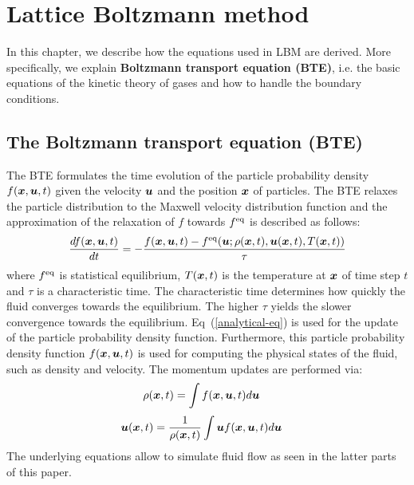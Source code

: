 \chapter{Lattice Boltzmann method}
\vspace{-8mm}
In this chapter, we describe how the equations used in LBM
are derived.
More specifically, we explain
{\bf Boltzmann transport equation (BTE)}\cite{mcnamara1988use}, i.e.
the basic equations of the kinetic theory of gases and
how to handle the boundary conditions.

\section{The Boltzmann transport equation (BTE)}
The BTE formulates the time evolution of the 
particle probability density $f(\boldsymbol{x}, \boldsymbol{u}, t)$ given
the velocity $\boldsymbol{u}$ and the position $\boldsymbol{x}$ of particles.
The BTE relaxes the particle distribution to
the Maxwell velocity distribution
function\cite{huang1963statistical} and the approximation of the relaxation of
$f$ towards $f^{\rm eq}$ is described as follows\cite{bhatnagar1954model}:
\begin{equation}
  \begin{aligned}
    \frac{d f(\boldsymbol{x}, \boldsymbol{u}, t)}{d t} &= 
    - \frac{
      f(\boldsymbol{x}, \boldsymbol{u}, t) - f^{\rm eq}(\boldsymbol{u}; \rho(\boldsymbol{x}, t), \boldsymbol{u}(\boldsymbol{x}, t), T(\boldsymbol{x}, t))
      }{\tau} \\
    \end{aligned}
    \label{analytical-eq}
  \end{equation}
where $f^{\rm eq}$ is statistical equilibrium,
$T(\boldsymbol{x}, t)$ is the temperature at $\boldsymbol{x}$
of time step $t$ and
$\tau$ is a characteristic time.
The characteristic time determines how quickly
the fluid converges towards the equilibrium.
The higher $\tau$ yields the slower 
convergence towards the equilibrium.
Eq~(\ref{analytical-eq}) is used for the update 
of the particle probability density function.
Furthermore, this particle probability density function
$f(\boldsymbol{x}, \boldsymbol{u}, t)$ is used for computing
the physical states of the fluid,
such as density and velocity.
The momentum updates are performed via\cite{caroli1984non}:
\begin{equation}
  \begin{aligned}
    \rho(\boldsymbol{x}, t) &= \int f(\boldsymbol{x}, \boldsymbol{u}, t) d\boldsymbol{u} 
  \end{aligned}
  \label{density-analytical-update}
\end{equation}
\begin{equation}
\begin{aligned}
  \boldsymbol{u}(\boldsymbol{x}, t) &= \frac{1}{\rho(\boldsymbol{x}, t)} \int \boldsymbol{u} f(\boldsymbol{x}, \boldsymbol{u}, t)  d\boldsymbol{u}
\end{aligned}
\label{velocity-analytical-update}
\end{equation}
The underlying equations allow to simulate
fluid flow as seen in the latter parts of this paper.

